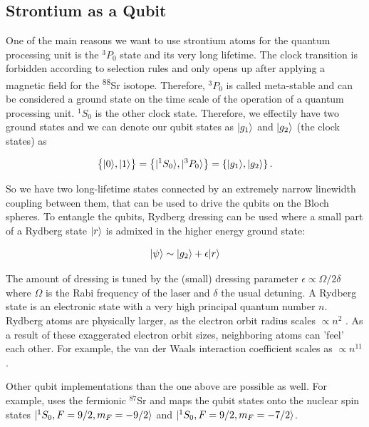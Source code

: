 \subsection{Strontium as a Qubit}\label{sec:QubitScheme}

One of the main reasons we want to use strontium atoms for the quantum processing unit is the ${}^3P_0$ state and its very long lifetime. 
The clock transition is forbidden according to selection rules and only opens up after applying a magnetic field for the \textsuperscript{88}Sr isotope.
Therefore, ${}^3P_0$ is called meta-stable and can be considered a ground state on the time scale of the operation of a quantum processing unit. 
${}^1S_0$ is the other clock state.
Therefore, we effectily have two ground states and we can denote our qubit states as $\lvert g_1\rangle$ and $\lvert g_2\rangle$ (the clock states) as

\begin{equation}\label{eq:QubitManifold}
	\big\{\lvert0\rangle,\lvert1\rangle\big\} = 
	\left\{
		\lvert{}^1S_0\rangle, \lvert{}^3P_0\rangle 
	\right\} = 
	\left\{ 
	    \lvert g_1\rangle, \lvert g_2\rangle
	\right\}.
\end{equation}

So we have two long-lifetime states connected by an extremely narrow linewidth coupling between them, that can be used to drive the qubits on the Bloch spheres.
To entangle the qubits, Rydberg dressing can be used \cite{Wu2021} where a small part of a Rydberg state $\lvert r\rangle$ is admixed in the higher energy ground state:

\begin{equation}\label{eq:RydbergDressing}
	\lvert\psi\rangle \sim \lvert g_2\rangle + \epsilon \lvert r\rangle
\end{equation}

The amount of dressing is tuned by the (small) dressing parameter $\epsilon \propto \Omega / 2\delta$ where $\Omega$ is the Rabi frequency of the laser and $\delta$ the usual detuning. 
A Rydberg state is an electronic state with a very high principal quantum number $n$. Rydberg atoms are physically larger, as the electron orbit radius scales $\propto n^2$ \cite{Gallagher1994}. 
As a result of these exaggerated electron orbit sizes, neighboring atoms can 'feel' each other.
For example, the van der Waals interaction coefficient scales as $\propto n^{11}$ \cite{Gallagher1994}. 

Other qubit implementations than the one above are possible as well.
For example, \cite{Barnes2021} uses the fermionic ${}^{87}$Sr and maps the qubit states onto the nuclear spin states $\lvert{}^1S_0, F=9/2, m_F = -9/2\rangle$ and $\lvert{}^1S_0, F=9/2, m_F = -7/2\rangle$.

